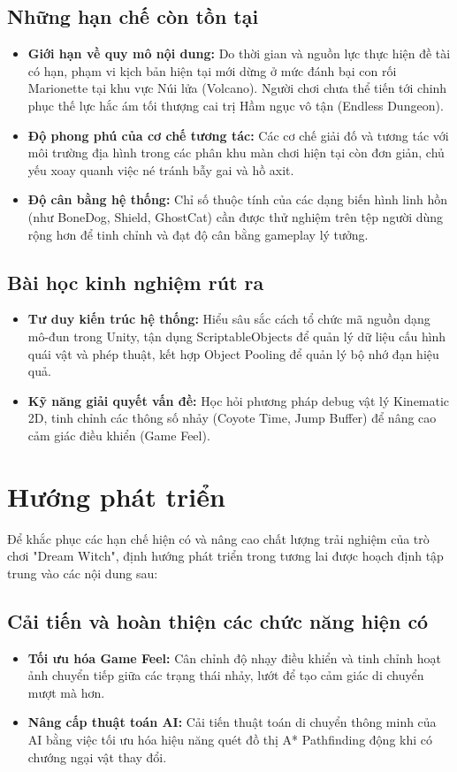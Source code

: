 \documentclass[../DoAn.tex]{subfiles}
\begin{document}
\subsection{Những hạn chế còn tồn tại}
\begin{itemize}
    \item \textbf{Giới hạn về quy mô nội dung:} Do thời gian và nguồn lực thực hiện đề tài có hạn, phạm vi kịch bản hiện tại mới dừng ở mức đánh bại con rối Marionette tại khu vực Núi lửa (Volcano). Người chơi chưa thể tiến tới chinh phục thế lực hắc ám tối thượng cai trị Hầm ngục vô tận (Endless Dungeon).
    \item \textbf{Độ phong phú của cơ chế tương tác:} Các cơ chế giải đố và tương tác với môi trường địa hình trong các phân khu màn chơi hiện tại còn đơn giản, chủ yếu xoay quanh việc né tránh bẫy gai và hồ axit.
    \item \textbf{Độ cân bằng hệ thống:} Chỉ số thuộc tính của các dạng biến hình linh hồn (như BoneDog, Shield, GhostCat) cần được thử nghiệm trên tệp người dùng rộng hơn để tinh chỉnh và đạt độ cân bằng gameplay lý tưởng.
\end{itemize}

\subsection{Bài học kinh nghiệm rút ra}
\begin{itemize}
    \item \textbf{Tư duy kiến trúc hệ thống:} Hiểu sâu sắc cách tổ chức mã nguồn dạng mô-đun trong Unity, tận dụng ScriptableObjects để quản lý dữ liệu cấu hình quái vật và phép thuật, kết hợp Object Pooling để quản lý bộ nhớ đạn hiệu quả.
    \item \textbf{Kỹ năng giải quyết vấn đề:} Học hỏi phương pháp debug vật lý Kinematic 2D, tinh chỉnh các thông số nhảy (Coyote Time, Jump Buffer) để nâng cao cảm giác điều khiển (Game Feel).
\end{itemize}

\section{Hướng phát triển}

Để khắc phục các hạn chế hiện có và nâng cao chất lượng trải nghiệm của trò chơi "Dream Witch", định hướng phát triển trong tương lai được hoạch định tập trung vào các nội dung sau:

\subsection{Cải tiến và hoàn thiện các chức năng hiện có}
\begin{itemize}
    \item \textbf{Tối ưu hóa Game Feel:} Cân chỉnh độ nhạy điều khiển và tinh chỉnh hoạt ảnh chuyển tiếp giữa các trạng thái nhảy, lướt để tạo cảm giác di chuyển mượt mà hơn.
    \item \textbf{Nâng cấp thuật toán AI:} Cải tiến thuật toán di chuyển thông minh của AI bằng việc tối ưu hóa hiệu năng quét đồ thị A* Pathfinding động khi có chướng ngại vật thay đổi.
\end{itemize}
\end{document}
